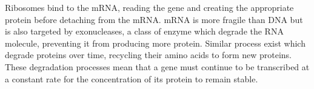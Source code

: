 \documentclass[twoside,a4paper]{article}
\begin{document}
\begin{multicols}{2}
Ribosomes bind to the mRNA, reading the gene and creating the appropriate
protein before detaching from the mRNA.
mRNA is more fragile than DNA but is also targeted by exonucleases, a class of
enzyme which degrade the RNA molecule, preventing it from producing more
protein.
Similar process exist which degrade proteins over time, recycling their amino
acids to form new proteins.
These degradation processes mean that a gene must continue to be transcribed at
a constant rate for the concentration of its protein to remain stable.








\end{multicols}
\end{document}

